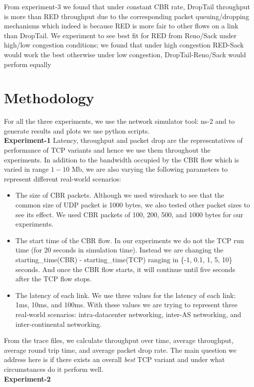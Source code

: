 \documentclass[USenglish,oneside,twocolumn]{article}
\begin{document}
From experiment-3 we found that under constant CBR rate, DropTail throughput is more than RED throughput due to the corresponding packet queuing/dropping mechanisms which indeed is because RED is more fair to other flows on a link than DropTail. We experiment to see best fit for RED from Reno/Sack under high/low congestion conditions; we found that under high congestion RED-Sack would work the best otherwise under low congestion, DropTail-Reno/Sack would perform equally

\section{Methodology}
For all the three experiments, we use the network simulator tool: ns-2 and to generate results and plots we use python scripts.\\
\noindent \textbf{Experiment-1}
Latency, throughput and packet drop are the representatives of performance of TCP variants and hence we use them throughout the experiments. In addition to the bandwidth occupied by the CBR flow which is varied in range \(1-10\) Mb, we are also varying the following parameters to represent different real-world scenarios:
\begin{itemize}
	\item The size of CBR packets. Although we used wireshark to see that the common size of UDP packet is 1000 bytes, we also tested other packet sizes to see its effect. We used CBR packets of 100, 200, 500, and 1000 bytes for our experiments.
	\item The start time of the CBR flow. In our experiments we do not the TCP run time (for 20 seconds in simulation time). Instead we are changing the starting\_time(CBR) - starting\_time(TCP) ranging in \{-1, 0.1, 1, 5, 10\} seconds. And once the CBR flow starts, it will continue until five seconds after the TCP flow stops.
	\item The latency of each link. We use three values for the latency of each link: 1ms, 10ms, and 100ms. With these values we are trying to represent three real-world scenarios: intra-datacenter networking, inter-AS networking, and inter-continental networking.
\end{itemize}
From the trace files, we calculate throughput over time, average throughput, average round trip time, and average packet drop rate. The main question we address here is if there exists an overall \textit{best} TCP variant and under what circumstances do it perform well. \\
\noindent \textbf{Experiment-2}
\end{document}
